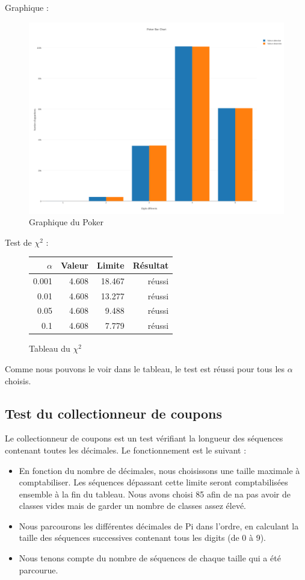 \documentclass[10pt,a4paper]{article}
\begin{document}
	\newpage
	Graphique :
	\begin{figure}[h]
		\centering
		\includegraphics[scale=0.25]{../chart_images/poker_bar_chart.png}
		\caption{Graphique du Poker}
	\end{figure}
	
	Test de $\chi^2$ :
	\begin{figure}[h]
		\centering
		\begin{tabular}{|r|r|r|r|}
			\hline
			$\alpha$ & Valeur & Limite & Résultat\\
			\hline
			0.001 & 4.608 & 18.467 & réussi\\
			0.01 & 4.608 & 13.277 & réussi\\
			0.05 & 4.608 & 9.488 & réussi\\
			0.1 & 4.608 & 7.779 & réussi\\
			\hline
		\end{tabular}
		\caption{Tableau du $\chi^2$}
	\end{figure}
	
	Comme nous pouvons le voir dans le tableau, le test est réussi pour tous les $\alpha$ choisis.
		
\newpage
	
\subsection{Test du collectionneur de coupons}
Le collectionneur de coupons est un test vérifiant la longueur des séquences contenant toutes les décimales. Le fonctionnement est le suivant :  
\begin{itemize}
	\item En fonction du nombre de décimales, nous choisissons une taille maximale à comptabiliser. Les séquences dépassant cette limite seront comptabilisées ensemble à la fin du tableau. Nous avons choisi 85 afin de na pas avoir de classes vides mais de garder un nombre de classes assez élevé.
\item Nous parcourons les différentes décimales de Pi dans l'ordre, en calculant la taille des séquences successives contenant tous les digits (de 0 à 9).
\item Nous tenons compte du nombre de séquences de chaque taille qui a été parcourue.
\end{itemize}
\end{document}

